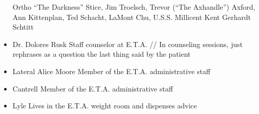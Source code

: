\documentclass{article}
\begin{document}
\begin{tcolorbox}[height=26cm]
\begin{itemize}
\scriptsize{Ortho “The Darkness” Stice, Jim Troelsch, Trevor (“The Axhandle”) Axford, Ann Kittenplan, Ted Schacht, LaMont Chu, U.S.S. Millicent Kent}
Gerhardt Schtitt
\item  \small{Dr. Dolores Rusk}\newline
\scriptsize{Staff counselor at E.T.A. // In counseling sessions, just rephrases as a question the last thing said by the patient}
\item  \small{Lateral Alice Moore}\newline
\scriptsize{Member of the E.T.A. administrative staff}
\item \small{Cantrell}\newline
\scriptsize{Member of the E.T.A. administrative staff}
\item \small{Lyle}\newline
\scriptsize{Lives in the E.T.A. weight room and dispenses advice}
\end{itemize}
\vspace{0.1cm}
\end{tcolorbox}
\newpage
\end{document}
